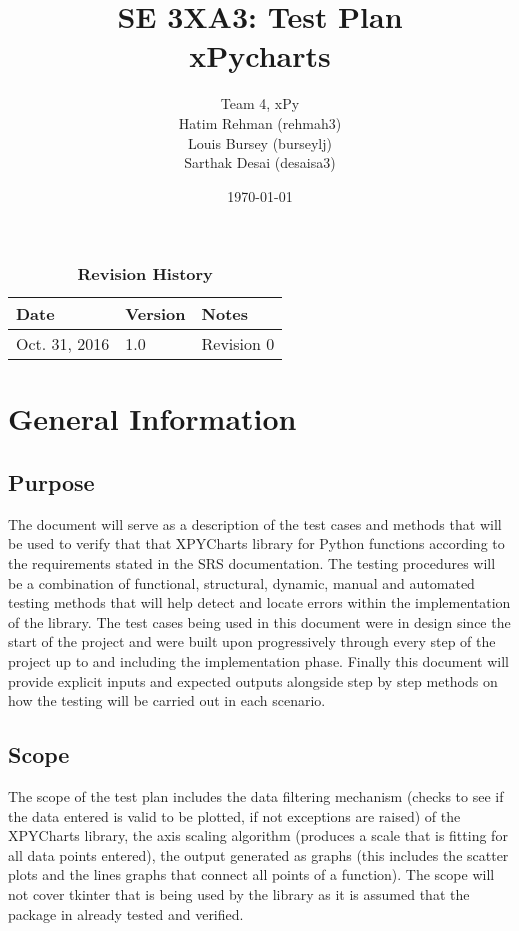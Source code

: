 \documentclass[12pt, titlepage]{article}
\title{SE 3XA3: Test Plan\\xPycharts}
\author{Team 4, xPy
		\\ Hatim Rehman (rehmah3)
		\\ Louis Bursey (burseylj)
		\\ Sarthak Desai (desaisa3)
}
\date{\today}
\begin{document}
\maketitle
{}
\tableofcontents
\listoftables
\listoffigures
\begin{table}[bp]
\caption{\bf Revision History}
\begin{tabularx}{\textwidth}{p{3cm}p{2cm}X}
\toprule {\bf Date} & {\bf Version} & {\bf Notes}\\
\midrule
Oct. 31, 2016 & 1.0 & Revision 0\\
\bottomrule
\end{tabularx}
\end{table}
\newpage
{}
\section{General Information}
\subsection{Purpose}
The document will serve as a description of the test cases and methods that will be used to verify that that XPYCharts library for Python functions according to the requirements stated in the SRS documentation. The testing procedures will be a combination of functional, structural, dynamic, manual and automated testing methods that will help detect and locate errors within the implementation of the library. The test cases being used in this document were in design since the start of the project and were built upon progressively through every step of the project up to and including the implementation phase. Finally this document will provide explicit inputs and expected outputs alongside step by step methods on how the testing will be carried out in each scenario. 
\subsection{Scope}
The scope of the test plan includes the data filtering mechanism (checks to see if the data entered is valid to be plotted, if not exceptions are raised) of the XPYCharts library, the axis scaling algorithm (produces a scale that is fitting for all data points entered), the output generated as graphs (this includes the scatter plots and the lines graphs that connect all points of a function). The scope will not cover tkinter that is being used by the library as it is assumed that the package in already tested and verified. 
\end{document}
